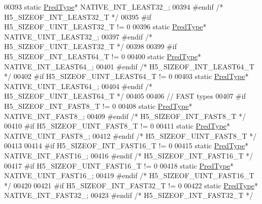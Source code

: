 \begin{DoxyCode}
00393         \textcolor{keyword}{static} \hyperlink{class_h5_1_1_pred_type}{PredType}* NATIVE\_INT\_LEAST32\_;
00394 \textcolor{preprocessor}{#endif }\textcolor{comment}{/* H5\_SIZEOF\_INT\_LEAST32\_T */}\textcolor{preprocessor}{}
00395 \textcolor{preprocessor}{#if H5\_SIZEOF\_UINT\_LEAST32\_T != 0}
00396         \textcolor{keyword}{static} \hyperlink{class_h5_1_1_pred_type}{PredType}* NATIVE\_UINT\_LEAST32\_;
00397 \textcolor{preprocessor}{#endif }\textcolor{comment}{/* H5\_SIZEOF\_UINT\_LEAST32\_T */}\textcolor{preprocessor}{}
00398 
00399 \textcolor{preprocessor}{#if H5\_SIZEOF\_INT\_LEAST64\_T != 0}
00400         \textcolor{keyword}{static} \hyperlink{class_h5_1_1_pred_type}{PredType}* NATIVE\_INT\_LEAST64\_;
00401 \textcolor{preprocessor}{#endif }\textcolor{comment}{/* H5\_SIZEOF\_INT\_LEAST64\_T */}\textcolor{preprocessor}{}
00402 \textcolor{preprocessor}{#if H5\_SIZEOF\_UINT\_LEAST64\_T != 0}
00403         \textcolor{keyword}{static} \hyperlink{class_h5_1_1_pred_type}{PredType}* NATIVE\_UINT\_LEAST64\_;
00404 \textcolor{preprocessor}{#endif }\textcolor{comment}{/* H5\_SIZEOF\_UINT\_LEAST64\_T */}\textcolor{preprocessor}{}
00405 
00406 \textcolor{comment}{// FAST types}
00407 \textcolor{preprocessor}{#if H5\_SIZEOF\_INT\_FAST8\_T != 0}
00408         \textcolor{keyword}{static} \hyperlink{class_h5_1_1_pred_type}{PredType}* NATIVE\_INT\_FAST8\_;
00409 \textcolor{preprocessor}{#endif }\textcolor{comment}{/* H5\_SIZEOF\_INT\_FAST8\_T */}\textcolor{preprocessor}{}
00410 \textcolor{preprocessor}{#if H5\_SIZEOF\_UINT\_FAST8\_T != 0}
00411         \textcolor{keyword}{static} \hyperlink{class_h5_1_1_pred_type}{PredType}* NATIVE\_UINT\_FAST8\_;
00412 \textcolor{preprocessor}{#endif }\textcolor{comment}{/* H5\_SIZEOF\_UINT\_FAST8\_T */}\textcolor{preprocessor}{}
00413 
00414 \textcolor{preprocessor}{#if H5\_SIZEOF\_INT\_FAST16\_T != 0}
00415         \textcolor{keyword}{static} \hyperlink{class_h5_1_1_pred_type}{PredType}* NATIVE\_INT\_FAST16\_;
00416 \textcolor{preprocessor}{#endif }\textcolor{comment}{/* H5\_SIZEOF\_INT\_FAST16\_T */}\textcolor{preprocessor}{}
00417 \textcolor{preprocessor}{#if H5\_SIZEOF\_UINT\_FAST16\_T != 0}
00418         \textcolor{keyword}{static} \hyperlink{class_h5_1_1_pred_type}{PredType}* NATIVE\_UINT\_FAST16\_;
00419 \textcolor{preprocessor}{#endif }\textcolor{comment}{/* H5\_SIZEOF\_UINT\_FAST16\_T */}\textcolor{preprocessor}{}
00420 
00421 \textcolor{preprocessor}{#if H5\_SIZEOF\_INT\_FAST32\_T != 0}
00422         \textcolor{keyword}{static} \hyperlink{class_h5_1_1_pred_type}{PredType}* NATIVE\_INT\_FAST32\_;
00423 \textcolor{preprocessor}{#endif }\textcolor{comment}{/* H5\_SIZEOF\_INT\_FAST32\_T */}\textcolor{preprocessor}{}

\end{DoxyCode}

